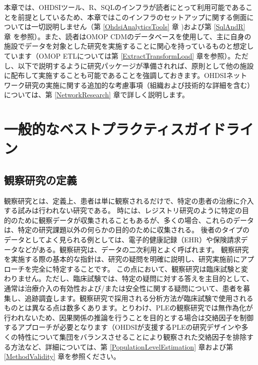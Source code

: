 \documentclass[
  11pt]{book}
\theoremstyle{definition}
\theoremstyle{definition}
\theoremstyle{definition}
\theoremstyle{definition}
\theoremstyle{remark}
\begin{document}
本章では、OHDSIツール、R、SQLのインフラが読者にとって利用可能であることを前提としているため、本章ではこのインフラのセットアップに関する側面については一切説明しません（第 \ref{OhdsiAnalyticsTools} 章 )および第 \ref{SqlAndR} 章 を参照）。また、読者はOMOP CDMのデータベースを使用して、主に自身の施設でデータを対象とした研究を実施することに関心を持っているものと想定しています（OMOP ETLについては第 \ref{ExtractTransformLoad} 章を参照）。ただし、以下で説明するように研究パッケージが準備されれば、原則として他の施設に配布して実施することも可能であることを強調しておきます。OHDSIネットワーク研究の実施に関する追加的な考慮事項（組織および技術的な詳細を含む）については、第 \ref{NetworkResearch} 章で詳しく説明します。

\section{一般的なベストプラクティスガイドライン}\label{ux4e00ux822cux7684ux306aux30d9ux30b9ux30c8ux30d7ux30e9ux30afux30c6ux30a3ux30b9ux30acux30a4ux30c9ux30e9ux30a4ux30f3}

\subsection{観察研究の定義}\label{ux89b3ux5bdfux7814ux7a76ux306eux5b9aux7fa9}

観察研究とは、定義上、患者は単に観察されるだけで、特定の患者の治療に介入する試みは行われない研究である。 時には、レジストリ研究のように特定の目的のために観察データが収集されることもあるが、多くの場合、これらのデータは、特定の研究課題以外の何らかの目的のために収集される。 後者のタイプのデータとしてよく見られる例としては、電子的健康記録（EHR）や保険請求データなどがある。観察研究は、データの二次利用とよく呼ばれます。 観察研究を実施する際の基本的な指針は、研究の疑問を明確に説明し、研究実施前にアプローチを完全に特定することです。 この点において、観察研究は臨床試験と変わりません。ただし、臨床試験では、特定の疑問に対する答えを主目的として、通常は治療介入の有効性および/または安全性に関する疑問について、患者を募集し、追跡調査します。観察研究で採用される分析方法が臨床試験で使用されるものとは異なる点は数多くあります。とりわけ、PLEの観察研究では無作為化が行われないため、因果関係の推論を行うことを目的とする場合は交絡因子を制御するアプローチが必要となります（OHDSIが支援するPLEの研究デザインや多くの特性について集団をバランスさせることにより観察された交絡因子を排除する方法など、詳細については、第 \ref{PopulationLevelEstimation} 章および第 \ref{MethodValidity} 章を参照ください。
\end{document}
